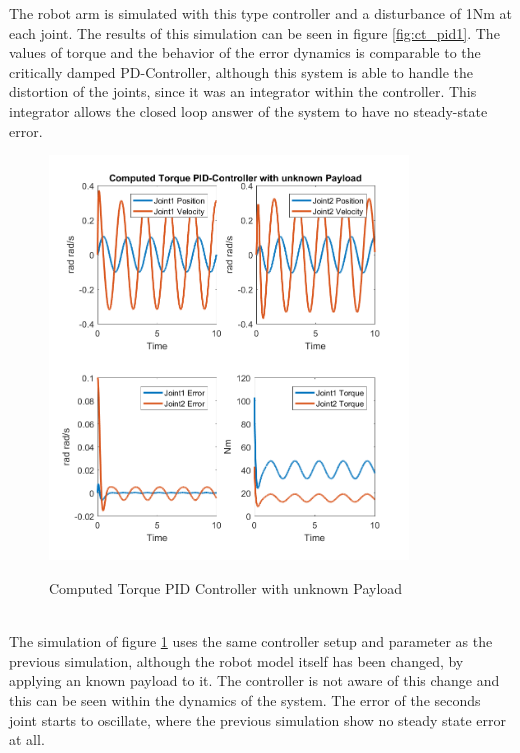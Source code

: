 The robot arm is simulated with this type controller and a disturbance of 1Nm at each joint. The results of this simulation can be seen in figure \ref{fig:ct_pid1}. The values of torque and the behavior of the error dynamics is comparable to the critically damped PD-Controller, although this system is able to handle the distortion of the joints, since it was an integrator within the controller. This integrator allows the closed loop answer of the system to have no steady-state error.\\
\begin{figure}[]
	\centering
	\includegraphics[width=0.85\textwidth]{pics/ComputedTorquePID-ControllerwithunknownPayload.png}\\
	\caption{Computed Torque PID Controller with unknown Payload}
	\label{fig:ct_pid2}
\end{figure}\\
The  simulation of figure \ref{fig:ct_pid2} uses the same controller setup and parameter as the previous simulation, although the robot model itself has been changed, by applying an known payload to it. The controller is not aware of this change and this can be seen within the dynamics of the system. The error of the seconds joint starts to oscillate, where the previous simulation show no steady state error at all.

